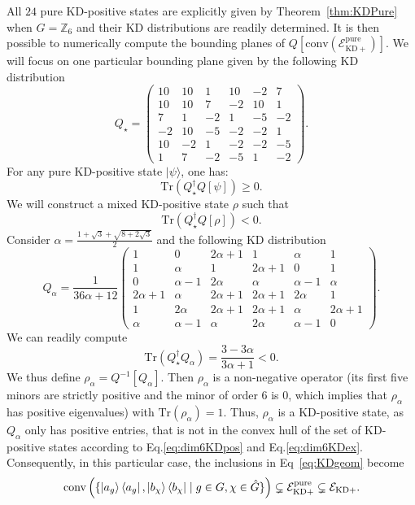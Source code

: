 \documentclass[a4paper, notitlepage, 11pt]{article}
\numberwithin{equation}{section}
\newcommand{\cket}[1]{|#1\rangle}
\newcommand{\mcl}[1]{\ensuremath{\mathcal{#1}}}
\newcommand{\EcalKDC}{{\mcl E}_{\mathrm{KD+}}}
\newcommand{\EcalKDCpu}{{\mcl E}_{\mathrm{KD+}}^{\mathrm{pure}}}
\newcommand{\Z}{\mathbb{Z}}
\newcommand{\conv}[1]{\mathrm{conv}\left(#1\right)}
\begin{document}
All $24$ pure KD-positive states are explicitly given by Theorem~\ref{thm:KDPure} when $G= \Z_6$ and their KD distributions are readily determined. It is then possible to numerically compute the bounding planes of $Q[\conv{\EcalKDCpu}]$. We will focus on one particular bounding plane given by the following KD distribution
\[
Q_{\star} = \begin{pmatrix}
    10&10&1&10&-2&7\\
    10&10&7&-2&10&1\\
    7&1&-2&1&-5&-2\\
    -2&10&-5&-2&-2&1\\
    10&-2&1&-2&-2&-5\\
    1&7&-2&-5&1&-2
\end{pmatrix}.
\]
For any pure KD-positive state $\cket{\psi}$, one has:
\begin{equation}\label{eq:dim6KDpos}
    \mathrm{Tr}\left(Q_{\star}^{\dagger}Q[\psi]\right) \geqslant 0.
\end{equation}
We will construct a mixed KD-positive state $\rho$ such that
\[
\mathrm{Tr}\left(Q_{\star}^{\dagger}Q[\rho]\right) < 0.
\]
Consider $\alpha = \frac{1+\sqrt{3} + \sqrt{8+2\sqrt{3}}}{2}$ and the following KD distribution
\begin{equation}
Q_{\alpha} = \frac{1}{36\alpha+12}\begin{pmatrix}
1&0&2\alpha+1&1&\alpha&1 \\
1 & \alpha& 1 & 2\alpha+1 & 0 & 1 \\
0 & \alpha-1 & 2\alpha & \alpha & \alpha-1 & \alpha \\
2\alpha+1 & \alpha & 2\alpha+1 & 2\alpha+1 & 2\alpha & 1 \\
1 & 2\alpha & 2\alpha+1 & 2\alpha+1& \alpha & 2\alpha+1\\
\alpha & \alpha-1 & \alpha & 2\alpha & \alpha-1 & 0
\end{pmatrix}.
\end{equation}
We can readily compute
\begin{equation}\label{eq:dim6KDex}
\mathrm{Tr}\left(Q_{\star}^{\dagger}Q_\alpha\right) = \frac{3-3\alpha}{3\alpha+1} <0.
\end{equation}
We thus define $\rho_{\alpha} = Q^{-1}[Q_{\alpha}]$. Then $\rho_{\alpha}$ is a non-negative operator (its first five minors are strictly positive and the minor of order $6$ is 0, which implies that $\rho_{\alpha}$ has positive eigenvalues) with $\mathrm{Tr}(\rho_{\alpha}) = 1$. Thus, $\rho_{\alpha}$ is a KD-positive state, as $Q_{\alpha}$ only has positive entries, that is not in the convex hull of the set of KD-positive states according to Eq.\eqref{eq:dim6KDpos} and Eq.\eqref{eq:dim6KDex}.
Consequently, in this particular case, the inclusions in Eq~\eqref{eq:KDgeom} become
\begin{equation}
    \conv{\{\cket{a_g}\bra{a_g}, \cket{b_\chi}\bra{b_\chi}\mid g\in G, \chi\in \hat{G}\}}\subsetneq \EcalKDCpu\subsetneq \EcalKDC.
\end{equation}
\end{document}
